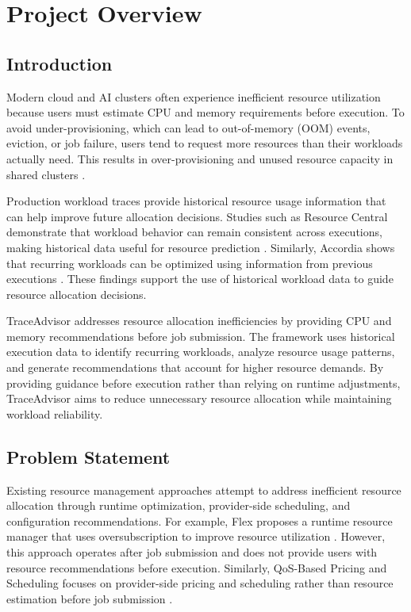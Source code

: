 \section{Project Overview}\label{sec:1}

\subsection{Introduction}\label{sec:1.1}

Modern cloud and AI clusters often experience inefficient resource utilization because users must estimate CPU and memory requirements before execution. To avoid under-provisioning, which can lead to out-of-memory (OOM) events, eviction, or job failure, users tend to request more resources than their workloads actually need. This results in over-provisioning and unused resource capacity in shared clusters \cite{ref1}.

Production workload traces provide historical resource usage information that can help improve future allocation decisions. Studies such as Resource Central demonstrate that workload behavior can remain consistent across executions, making historical data useful for resource prediction \cite{ref2}. Similarly, Accordia shows that recurring workloads can be optimized using information from previous executions \cite{ref3}. These findings support the use of historical workload data to guide resource allocation decisions.

TraceAdvisor addresses resource allocation inefficiencies by providing CPU and memory recommendations before job submission. The framework uses historical execution data to identify recurring workloads, analyze resource usage patterns, and generate recommendations that account for higher resource demands. By providing guidance before execution rather than relying on runtime adjustments, TraceAdvisor aims to reduce unnecessary resource allocation while maintaining workload reliability.

\subsection{Problem Statement}\label{sec:1.2}

Existing resource management approaches attempt to address inefficient resource allocation through runtime optimization, provider-side scheduling, and configuration recommendations. For example, Flex proposes a runtime resource manager that uses oversubscription to improve resource utilization \cite{ref1}. However, this approach operates after job submission and does not provide users with resource recommendations before execution. Similarly, QoS-Based Pricing and Scheduling focuses on provider-side pricing and scheduling rather than resource estimation before job submission \cite{ref4}.

